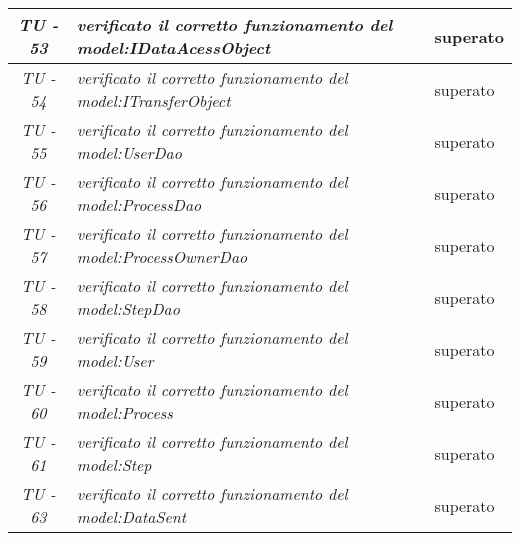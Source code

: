 \begin{small}\centering
\begin{tabular}{|c|p{8.0cm}|p{2.0cm}|}
\textit{TU - 53} &
\textit{verificato il corretto funzionamento del model:IDataAcessObject} & superato \\
\hline

\textit{TU - 54} &
\textit{verificato il corretto funzionamento del model:ITransferObject} & superato \\
\hline

\textit{TU - 55} &
\textit{verificato il corretto funzionamento del model:UserDao} & superato \\
\hline

\textit{TU - 56} &
\textit{verificato il corretto funzionamento del model:ProcessDao} & superato \\
\hline

\textit{TU - 57} &
\textit{verificato il corretto funzionamento del model:ProcessOwnerDao} & superato \\
\hline

\textit{TU - 58} &
\textit{verificato il corretto funzionamento del model:StepDao} & superato \\
\hline

\textit{TU - 59} &
\textit{verificato il corretto funzionamento del model:User} & superato \\
\hline

\textit{TU - 60} &
\textit{verificato il corretto funzionamento del model:Process} & superato \\
\hline

\textit{TU - 61} &
\textit{verificato il corretto funzionamento del model:Step} & superato \\
\hline

\textit{TU - 63} &
\textit{verificato il corretto funzionamento del model:DataSent} & superato \\
\hline
\end{tabular}\\
\end{small}


